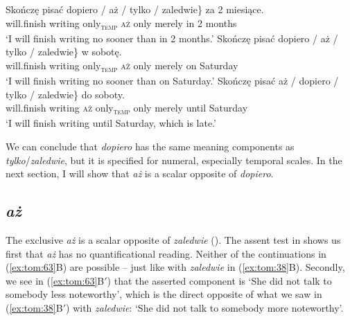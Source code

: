 \documentclass[output=paper,colorlinks,citecolor=brown]{langscibook}
\begin{document}
\ea\label{ex:tom:62}
\ea\label{ex:tom:62a} 
\gll Skończę pisać \minsp{\{} dopiero / aż / \minsp{\#} tylko / \minsp{\#} zaledwie\} za 2 miesiące.\\
will.finish writing {} only\textsubscript{\textsc{temp}} {} \textsc{aż} {} {} only {} {} merely in 2 months\\
\glt ‘I will finish writing no sooner than in 2 months.’
\ex\label{ex:tom:62b}            
\gll Skończę pisać \minsp{\{} dopiero / \minsp{\#} aż / \minsp{\#} tylko / \minsp{\#} zaledwie\} w sobotę.\\
will.finish writing {} only\textsubscript{\textsc{temp}} {} {} \textsc{aż} {} {} only {} {} merely on Saturday\\
\glt ‘I will finish writing no sooner than on Saturday.’
\ex\label{ex:tom:62c}            
\gll Skończę pisać \minsp{\{} aż / \minsp{\#} dopiero / \minsp{\#} tylko / \minsp{\#} zaledwie\} do soboty.\\
will.finish writing {} \textsc{aż} {} {} only\textsubscript{\textsc{temp}} {} {} only {} {} merely until Saturday\\
\glt ‘I will finish writing until Saturday, which is late.’
\z 
\z 

\noindent We can conclude that \textit{dopiero} has the same meaning components as \textit{tylko}/\textit{zale\-dwie}, but it is specified for numeral, especially temporal scales. In the next section, I will show that \textit{aż} is a scalar opposite of \textit{dopiero}.

\subsection{\textit{aż}}
\label{sec:tom:4.5}

The exclusive \textit{aż} is a scalar opposite of \textit{zaledwie} (\citealt{tomaszewicz12,tomaszewicz13,tomaszewicz13a}). The assent test in  shows us first that \textit{aż} has no quantificational reading. Neither of the continuations in (\ref{ex:tom:63}B) are possible -- just like with \textit{zaledwie} in (\ref{ex:tom:38}B). Secondly, we see in (\ref{ex:tom:63}B$'$) that the asserted component is `She did not talk to somebody less noteworthy', which is the direct opposite of what we saw in (\ref{ex:tom:38}B$'$) with \textit{zaledwie}: `She did not talk to somebody more noteworthy'. 
\end{document}
